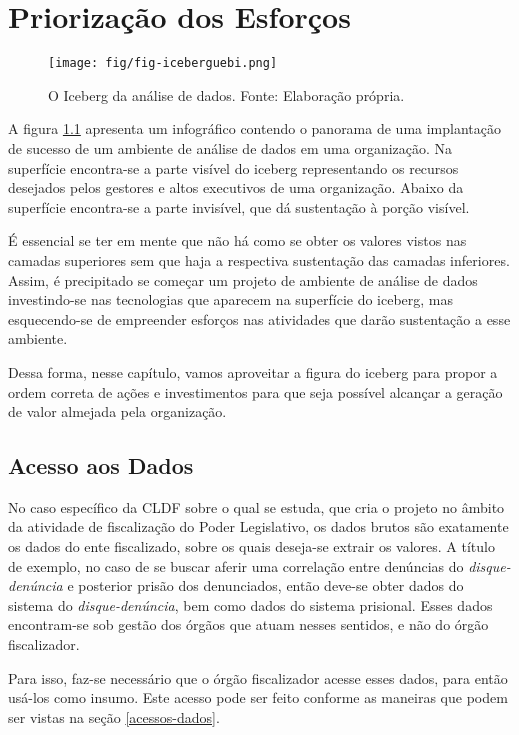 \chapter{Priorização dos Esforços}
\label{cap-esforcos}

    \begin{figure}[htbp!]
        \texttt{[image: fig/fig-iceberguebi.png]}
        \caption{O Iceberg da análise de dados. Fonte: Elaboração própria.}
        \label{fig:icebergbi}
    \end{figure}
    
A figura \ref{fig:icebergbi} apresenta um infográfico contendo o panorama de uma implantação de sucesso de um ambiente de análise de dados em uma organização. Na superfície encontra-se a parte visível do iceberg representando os recursos desejados pelos gestores e altos executivos de uma organização. Abaixo da superfície encontra-se a parte invisível, que dá sustentação à porção visível.

É essencial se ter em mente que não há como se obter os valores vistos nas camadas superiores sem que haja a respectiva sustentação das camadas inferiores. Assim, é precipitado se começar um projeto de ambiente de análise de dados investindo-se nas tecnologias que aparecem na superfície do iceberg, mas esquecendo-se de empreender esforços nas atividades que darão sustentação a esse ambiente. 

Dessa forma, nesse capítulo, vamos aproveitar a figura do iceberg para propor a ordem correta de ações e investimentos para que seja possível alcançar a geração de valor almejada pela organização.

\section{Acesso aos Dados}

No caso específico da CLDF sobre o qual se estuda, que cria o projeto no âmbito da atividade de fiscalização do Poder Legislativo, os dados brutos são exatamente os dados do ente fiscalizado, sobre os quais deseja-se extrair os valores. A título de exemplo, no caso de se buscar aferir uma correlação entre denúncias do \emph{disque-denúncia} e posterior prisão dos denunciados, então deve-se obter dados do sistema do \emph{disque-denúncia}, bem como dados do sistema prisional. Esses dados encontram-se sob gestão dos órgãos que atuam nesses sentidos, e não do órgão fiscalizador.

Para isso, faz-se necessário que o órgão fiscalizador acesse esses dados, para então usá-los como insumo. Este acesso pode ser feito conforme as maneiras que podem ser vistas na seção \ref{acessos-dados}.

